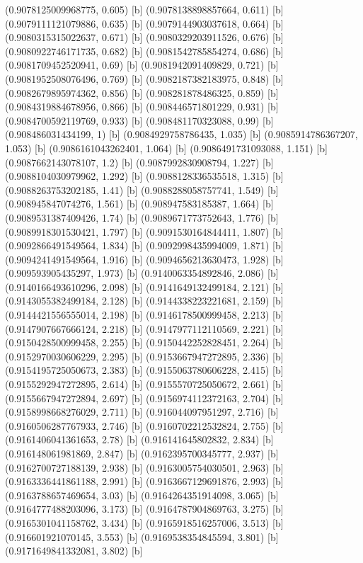 {{{(0.9078125009968775, 0.605) [b] 
(0.9078138898857664, 0.611) [b] 
(0.9079111121079886, 0.635) [b] 
(0.9079144903037618, 0.664) [b] 
(0.9080315315022637, 0.671) [b] 
(0.9080329203911526, 0.676) [b] 
(0.9080922746171735, 0.682) [b] 
(0.9081542785854274, 0.686) [b] 
(0.9081709452520941, 0.69) [b] 
(0.9081942091409829, 0.721) [b] 
(0.9081952508076496, 0.769) [b] 
(0.9082187382183975, 0.848) [b] 
(0.9082679895974362, 0.856) [b] 
(0.908281878486325, 0.859) [b] 
(0.9084319884678956, 0.866) [b] 
(0.908446571801229, 0.931) [b] 
(0.9084700592119769, 0.933) [b] 
(0.908481170323088, 0.99) [b] 
(0.908486031434199, 1) [b] 
(0.9084929758786435, 1.035) [b] 
(0.9085914786367207, 1.053) [b] 
(0.9086161043262401, 1.064) [b] 
(0.9086491731093088, 1.151) [b] 
(0.9087662143078107, 1.2) [b] 
(0.9087992830908794, 1.227) [b] 
(0.9088104030979962, 1.292) [b] 
(0.9088128336535518, 1.315) [b] 
(0.9088263753202185, 1.41) [b] 
(0.9088288058757741, 1.549) [b] 
(0.908945847074276, 1.561) [b] 
(0.908947583185387, 1.664) [b] 
(0.9089531387409426, 1.74) [b] 
(0.9089671773752643, 1.776) [b] 
(0.9089918301530421, 1.797) [b] 
(0.9091530164844411, 1.807) [b] 
(0.9092866491549564, 1.834) [b] 
(0.9092998435994009, 1.871) [b] 
(0.9094241491549564, 1.916) [b] 
(0.9094656213630473, 1.928) [b] 
(0.909593905435297, 1.973) [b] 
(0.9140063354892846, 2.086) [b] 
(0.9140166493610296, 2.098) [b] 
(0.9141649132499184, 2.121) [b] 
(0.9143055382499184, 2.128) [b] 
(0.9144338223221681, 2.159) [b] 
(0.9144421556555014, 2.198) [b] 
(0.9146178500999458, 2.213) [b] 
(0.9147907667666124, 2.218) [b] 
(0.9147977112110569, 2.221) [b] 
(0.9150428500999458, 2.255) [b] 
(0.9150442252828451, 2.264) [b] 
(0.9152970030606229, 2.295) [b] 
(0.9153667947272895, 2.336) [b] 
(0.9154195725050673, 2.383) [b] 
(0.9155063780606228, 2.415) [b] 
(0.9155292947272895, 2.614) [b] 
(0.9155570725050672, 2.661) [b] 
(0.9155667947272894, 2.697) [b] 
(0.9156974112372163, 2.704) [b] 
(0.9158998668276029, 2.711) [b] 
(0.916044097951297, 2.716) [b] 
(0.9160506287767933, 2.746) [b] 
(0.9160702212532824, 2.755) [b] 
(0.9161406041361653, 2.78) [b] 
(0.916141645802832, 2.834) [b] 
(0.916148061981869, 2.847) [b] 
(0.9162395700345777, 2.937) [b] 
(0.9162700727188139, 2.938) [b] 
(0.9163005754030501, 2.963) [b] 
(0.9163336441861188, 2.991) [b] 
(0.9163667129691876, 2.993) [b] 
(0.9163788657469654, 3.03) [b] 
(0.9164264351914098, 3.065) [b] 
(0.9164777488203096, 3.173) [b] 
(0.9164787904869763, 3.275) [b] 
(0.9165301041158762, 3.434) [b] 
(0.9165918516257006, 3.513) [b] 
(0.916601921070145, 3.553) [b] 
(0.9169538354845594, 3.801) [b] 
(0.9171649841332081, 3.802) [b] 
}}}
